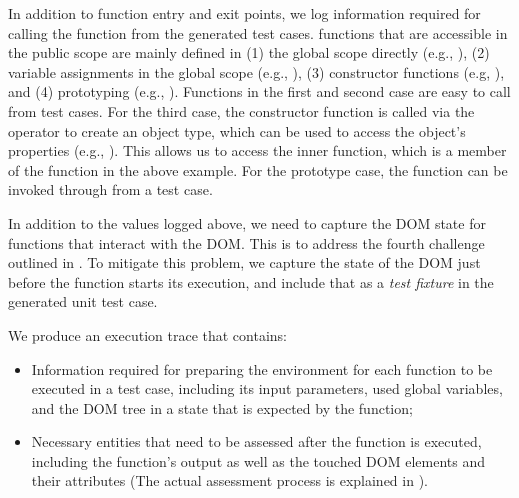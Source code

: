 In addition to function entry and exit points, we log information required for calling  the function from the generated test cases. %
\javascript functions that are accessible in the public scope are mainly defined in  (1) the global scope directly (e.g., ), (2) variable assignments   in the global scope (e.g., ), (3) constructor functions (e.g,  ), and (4) prototyping (e.g., ). 
Functions in the first and second case are easy to call from test cases. For the third case, the constructor function is called via the  operator to create an object type, which can be used to access the object's properties
(e.g., ).
This allows us to access the inner function, which is a member of the  function in the above example.
For the prototype case, the function can be invoked through  from a test case. 

In addition to the values logged above, we need to capture the DOM state for functions that interact with the DOM. This is to address the fourth challenge outlined in .
To mitigate this problem, we capture the state of the DOM just before the function starts its execution, and include that as a \emph{test fixture} in the generated unit test case.

We produce an execution trace that contains:
 
\begin{itemize}[noitemsep]
\item Information required for preparing the environment for each function to be executed in a test case, including its input parameters, used global variables, and the DOM tree in a state that is expected by the function;
\item Necessary entities that need to be assessed after the function is executed, including the function's output as well as the touched DOM elements and their attributes (The actual assessment process is explained in ).
\end{itemize}



